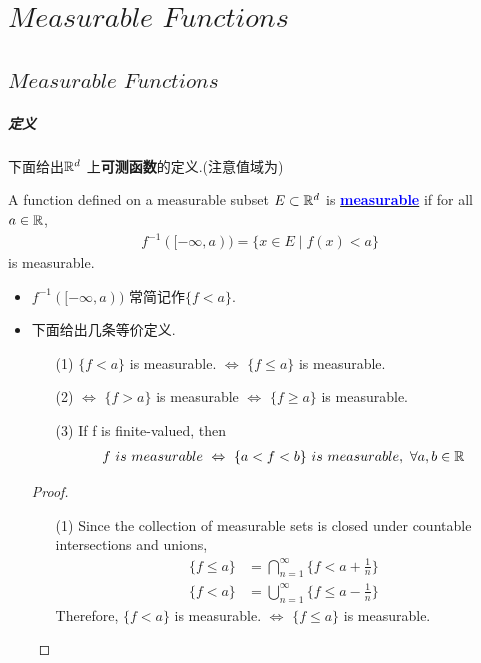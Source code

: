 \ifx\allfiles\undefined


	\else
	\fi
\chapter{$Measurable \,\, Functions$}
\section{$Measurable \,\, Functions$}
\paragraph{定义}
	下面给出$\mathbb{R}^d$ 上\textbf{可测函数}的定义.(注意值域为)
	\begin{defn}\label{def 2.1.1}
		A function defined on a measurable subset $E \subset \mathbb{R}^d$ is \underline{\textcolor{blue}{\textbf{measurable}}} if for all $a \in \mathbb{R}$,
		\begin{align}
			f^{-1}([-\infty , a)) = \{ x \in E \mid f(x) < a \}
		\end{align}
		is measurable.
		
		\begin{rmk}
			\begin{itemize}
				\item $f^{-1}([-\infty , a))$ 常简记作$\{ f < a \}$.
				
				\item 下面给出几条等价定义.
				\begin{enumerate}
					\item[(1)]$\{ f < a \}$ is measurable. $\Leftrightarrow$ $\{ f \leq a \}$ is measurable.
					
					\item[(2)]$\Leftrightarrow$ $\{ f > a \}$ is measurable $\Leftrightarrow$ $\{ f \geq a \}$ is measurable.
					
					\item[(3)]If f is finite-valued, then
					\begin{align}
						f \,\, is \,\, measurable \,\, \Leftrightarrow \,\, \{ a < f < b \} \,\, is \,\, measurable, \,\, \forall a , b \in \mathbb{R}
					\end{align}
				\end{enumerate}
			
				\vspace{2em}
				\begin{proof}
					\begin{enumerate}
						\item[(1)]Since the collection of measurable sets is closed under countable intersections and unions,
						\begin{align}
							\{ f \leq a \} &= \bigcap_{n = 1}^{\infty}{\{ f < a + \frac{1}{n} \}} \\
							\{ f < a \} &= \bigcup_{n = 1}^{\infty}{\{ f \leq a - \frac{1}{n} \}}
						\end{align}
						Therefore, $\{ f < a \}$ is measurable. $\Leftrightarrow$ $\{ f \leq a \}$ is measurable.
						

\end{enumerate}
\end{proof}
\end{itemize}
\end{rmk}
\end{defn}
